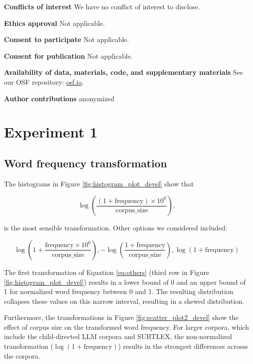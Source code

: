 \documentclass[manuscript]{stjour}
\begin{document}
\textbf{Conflicts of interest} We have no conflict of interest to disclose. 

\textbf{Ethics approval} Not applicable. 

\textbf{Consent to participate} Not applicable. 

\textbf{Consent for publication} Not applicable. 

\textbf{Availability of data, materials, code, and supplementary materials} See our OSF repository: \href{dx.doi.org/10.17605/OSF.IO/WMUVJ}{osf.io}. 

\textbf{Author contributions} anonymized


\newpage
%  

\newpage

\appendix

\section{Experiment 1}

\subsection{Word frequency transformation}\label{sec:word_freq_transform}

The histograms in Figure \ref{fig:histogram_plot_devel} show that 

\begin{equation}
\log\left(\frac{(1 + \text{frequency}) \times 10^6}{\text{corpus\_size}}\right),    
\label{eq:theone}
\end{equation}

is the most sensible transformation. Other options we considered included: 

\begin{equation}
\log \left( 1 + \frac{\text{frequency} \times 10^6}{\text{corpus\_size}} \right), 
- \log \left( \frac{1 + \text{frequency}}{\text{corpus\_size}} \right), 
\log \left( 1 + \text{frequency} \right) 
\label{eq:others}
\end{equation}

The first transformation of Equation \ref{eq:others} (third row in Figure \ref{fig:histogram_plot_devel}) results in a lower bound of 0 and an upper bound of 1 for normalized word frequency between 0 and 1. The resulting distribution collapses these values on this narrow interval, resulting in a skewed distribution. 

Furthermore, the transformations in Figure \ref{fig:scatter_plot2_devel} show the effect of corpus size on the transformed word frequency. For larger corpora, which include the child-directed LLM corpora and SUBTLEX, the non-normalized transformation ($\log \left( 1 + \text{frequency} \right)$) results in the strongest differences acrosss the corpora. 
\end{document}
